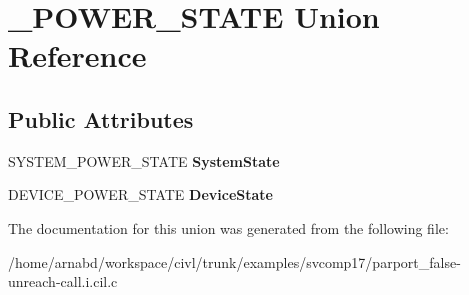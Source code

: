 \hypertarget{union__POWER__STATE}{}\section{\+\_\+\+P\+O\+W\+E\+R\+\_\+\+S\+T\+A\+T\+E Union Reference}
\label{union__POWER__STATE}
\subsection*{Public Attributes}
\begin{DoxyCompactItemize}
\item 
\hypertarget{union__POWER__STATE_aa2a1d9aa843d96846c086b504e9aa906}{}S\+Y\+S\+T\+E\+M\+\_\+\+P\+O\+W\+E\+R\+\_\+\+S\+T\+A\+T\+E {\bfseries System\+State}\label{union__POWER__STATE_aa2a1d9aa843d96846c086b504e9aa906}

\item 
\hypertarget{union__POWER__STATE_a2266bde3864e8ac648937d1b0d5fe742}{}D\+E\+V\+I\+C\+E\+\_\+\+P\+O\+W\+E\+R\+\_\+\+S\+T\+A\+T\+E {\bfseries Device\+State}\label{union__POWER__STATE_a2266bde3864e8ac648937d1b0d5fe742}

\end{DoxyCompactItemize}


The documentation for this union was generated from the following file\+:\begin{DoxyCompactItemize}
\item 
/home/arnabd/workspace/civl/trunk/examples/svcomp17/parport\+\_\+false-\/unreach-\/call.\+i.\+cil.\+c\end{DoxyCompactItemize}
